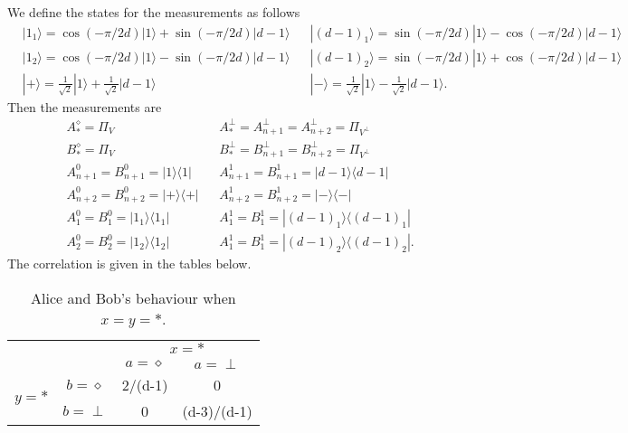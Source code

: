 \documentclass[11pt,letterpaper]{article}
\newcommand{\ket}[1]{|#1\rangle}
\newcommand{\ketbra}[2]{|#1\rangle\langle#2|}
\newcommand{\1}{\mathbb{1}}
\theoremstyle{definition}
\begin{document}
We define the states for the measurements as follows
\begin{align*}
	&\ket{1_1} = \cos(-\pi/2d)\ket{1} + \sin(-\pi/2d)\ket{d-1}
	&&\ket{(d-1)_1} = \sin(-\pi/2d)\ket{1} - \cos(-\pi/2d)\ket{d-1}\\
	&\ket{1_2} = \cos(-\pi/2d)\ket{1} - \sin(-\pi/2d)\ket{d-1}
	&&\ket{(d-1)_2} = \sin(-\pi/2d)\ket{1} + \cos(-\pi/2d)\ket{d-1}\\
	&\ket{+} = \frac{1}{\sqrt{2}}\ket{1} + \frac{1}{\sqrt{2}}\ket{d-1}
	&&\ket{-} = \frac{1}{\sqrt{2}}\ket{1} - \frac{1}{\sqrt{2}}\ket{d-1}.
\end{align*}
Then the measurements are
\begin{align}
	&A_\ast^\diamond = \Pi_V && A_\ast^\perp = A_{n+1}^\perp = A_{n+2}^\perp = \Pi_{V^\perp}\\
	&B_\ast^\diamond = \Pi_V && B_\ast^\perp = B_{n+1}^\perp = B_{n+2}^\perp = \Pi_{V^\perp}\\
	&A_{n+1}^0 =B_{n+1}^0= \ketbra{1}{1} && A_{n+1}^1=B_{n+1}^1 = \ketbra{d-1}{d-1}\\
	&A_{n+2}^0 =B_{n+2}^0= \ketbra{+}{+} && A_{n+2}^1= B_{n+2}^1 = \ketbra{-}{-}\\
	&A_1^0 = B_1^0 = \ketbra{1_1}{1_1} && A_1^1 = B_1^1 = \ketbra{(d-1)_1}{(d-1)_1}\\
	&A_2^0 = B_2^0 = \ketbra{1_2}{1_2} && A_1^1 = B_1^1 = \ketbra{(d-1)_2}{(d-1)_2}.
\end{align}
The correlation is given in the tables below.
\begin{table}[H]
\begin{center}
\begin{tabular}{|c|c||c|c|}
\hline
\multicolumn{2}{|c|}{} &
\multicolumn{2}{|c|}{$x=\ast$}\\
\cline{3-4}
\multicolumn{2}{|c|}{} &$a = \diamond$ & $a = \perp$ \\
\hline
\hline
\multirow{2}{*}{$y = \ast$} & $b=\diamond$ & 2/(d-1) & 0 \\
\cline{2-4}
&$b=\perp$ & 0 & (d-3)/(d-1) \\
\hline
\end{tabular}
\caption{Alice and Bob's behaviour when $x=y=\ast$.}
\end{center}
\end{table}
\end{document}
